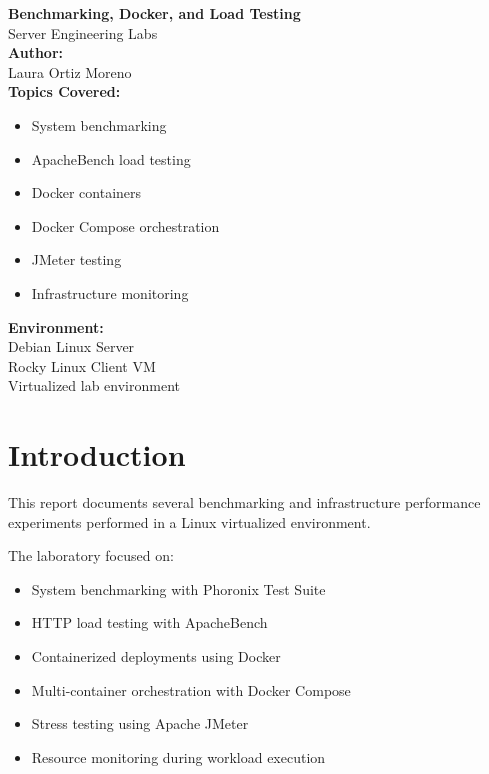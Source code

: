 \documentclass[11pt,a4paper]{article}
\begin{document}
\begin{titlepage}
    \centering

    \vspace*{3cm}

    {\Huge \textbf{Benchmarking, Docker, and Load Testing}}\\[1cm]

    {\Large Server Engineering Labs}\\[2cm]

    \textbf{Author:}\\
    Laura Ortiz Moreno\\[1cm]

    \textbf{Topics Covered:}
    \begin{itemize}[leftmargin=4cm]
        \item System benchmarking
        \item ApacheBench load testing
        \item Docker containers
        \item Docker Compose orchestration
        \item JMeter testing
        \item Infrastructure monitoring
    \end{itemize}

    \vfill

    \textbf{Environment:}\\
    Debian Linux Server\\
    Rocky Linux Client VM\\
    Virtualized lab environment

    \vspace{1cm}

\end{titlepage}

\tableofcontents
\newpage

\section{Introduction}

This report documents several benchmarking and infrastructure performance experiments performed in a Linux virtualized environment.

The laboratory focused on:
\begin{itemize}
    \item System benchmarking with Phoronix Test Suite
    \item HTTP load testing with ApacheBench
    \item Containerized deployments using Docker
    \item Multi-container orchestration with Docker Compose
    \item Stress testing using Apache JMeter
    \item Resource monitoring during workload execution
\end{itemize}
\end{document}
